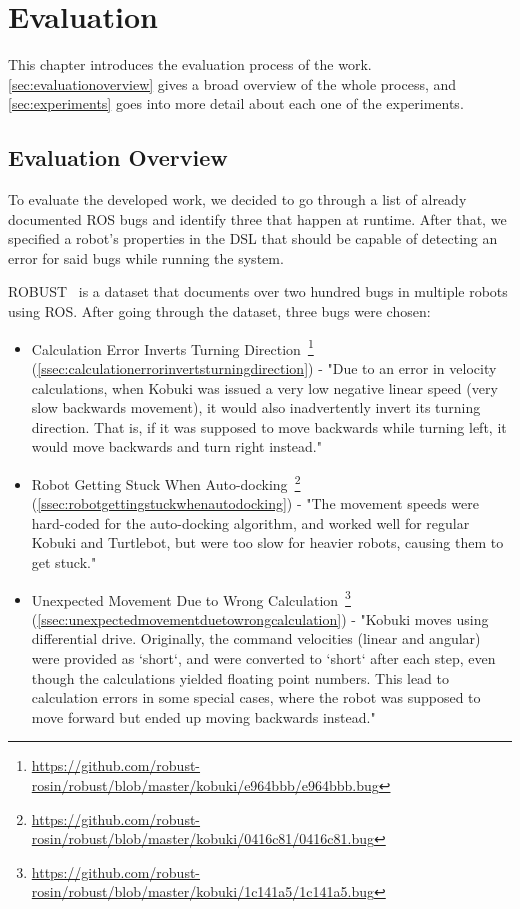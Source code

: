 \chapter{Evaluation}
\label{chap:evaluation}

This chapter introduces the evaluation process of the work. \autoref{sec:evaluationoverview} gives a broad overview of the whole process, and \autoref{sec:experiments} goes into more detail about each one of the experiments.


\section{Evaluation Overview}
\label{sec:evaluationoverview}

To evaluate the developed work, we decided to go through a list of already documented ROS bugs and identify three that happen at runtime. After that, we specified a robot's properties in the DSL that should be capable of detecting an error for said bugs while running the system.

ROBUST~\cite{robust} is a dataset that documents over two hundred bugs in multiple robots using ROS. After going through the dataset, three bugs were chosen:

\begin{itemize}
    \item Calculation Error Inverts Turning Direction~\footnote{\url{https://github.com/robust-rosin/robust/blob/master/kobuki/e964bbb/e964bbb.bug}} (\autoref{ssec:calculationerrorinvertsturningdirection}) - "Due to an error in velocity calculations, when Kobuki was issued a very low negative linear speed (very slow backwards movement), it would also inadvertently invert its turning direction. That is, if it was supposed to move backwards while turning left, it would move backwards and turn right instead."
    \item Robot Getting Stuck When Auto-docking~\footnote{\url{https://github.com/robust-rosin/robust/blob/master/kobuki/0416c81/0416c81.bug}} (\autoref{ssec:robotgettingstuckwhenautodocking}) - "The movement speeds were hard-coded for the auto-docking algorithm, and worked well for regular Kobuki and Turtlebot, but were too slow for heavier robots, causing them to get stuck."
    \item Unexpected Movement Due to Wrong Calculation~\footnote{\url{https://github.com/robust-rosin/robust/blob/master/kobuki/1c141a5/1c141a5.bug}} (\autoref{ssec:unexpectedmovementduetowrongcalculation}) - "Kobuki moves using differential drive. Originally, the command velocities (linear and angular) were provided as `short`, and were converted to `short` after each step, even though the calculations yielded floating point numbers. This lead to calculation errors in some special cases, where the robot was supposed to move forward but ended up moving backwards instead."
\end{itemize}

